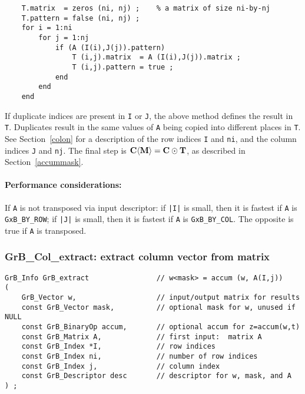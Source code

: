 \documentclass[12pt]{article}
\begin{document}
    \vspace{-0.1in}
    {\footnotesize
    \begin{verbatim}
    T.matrix  = zeros (ni, nj) ;    % a matrix of size ni-by-nj
    T.pattern = false (ni, nj) ;
    for i = 1:ni
        for j = 1:nj
            if (A (I(i),J(j)).pattern)
                T (i,j).matrix  = A (I(i),J(j)).matrix ;
                T (i,j).pattern = true ;
            end
        end
    end \end{verbatim}}

\vspace{-0.1in}
If duplicate indices are present in \verb'I' or \verb'J', the above method
defines the result in \verb'T'.  Duplicates result in the same values of
\verb'A' being copied into different places in \verb'T'.
See Section~\ref{colon} for a description of the row indices
\verb'I' and \verb'ni', and the column indices
\verb'J' and \verb'nj'.
The final step is ${\bf C \langle M \rangle  = C \odot
T}$, as described in Section~\ref{accummask}.

\paragraph{\bf Performance considerations:} %
If \verb'A' is not transposed via input descriptor: if \verb'|I|' is small,
then it is fastest if \verb'A' is \verb'GxB_BY_ROW'; if
\verb'|J|' is small, then it is fastest if \verb'A' is
\verb'GxB_BY_COL'.  The opposite is true if \verb'A' is transposed.

\newpage
\subsubsection{{\sf GrB\_Col\_extract:} extract column vector from matrix}
\label{extract_column}

\begin{mdframed}[userdefinedwidth=6in]
{\footnotesize
\begin{verbatim}
GrB_Info GrB_extract                // w<mask> = accum (w, A(I,j))
(
    GrB_Vector w,                   // input/output matrix for results
    const GrB_Vector mask,          // optional mask for w, unused if NULL
    const GrB_BinaryOp accum,       // optional accum for z=accum(w,t)
    const GrB_Matrix A,             // first input:  matrix A
    const GrB_Index *I,             // row indices
    const GrB_Index ni,             // number of row indices
    const GrB_Index j,              // column index
    const GrB_Descriptor desc       // descriptor for w, mask, and A
) ;
\end{verbatim} } \end{mdframed}
\end{document}
